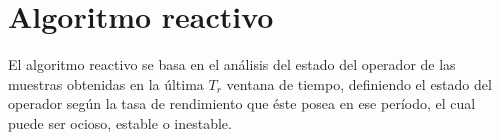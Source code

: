 


\section{Algoritmo reactivo}

\normalsize{El algoritmo reactivo se basa en el análisis del estado del operador de las muestras obtenidas en la última $T_r$ ventana de tiempo, definiendo el estado del operador según la tasa de rendimiento que éste posea en ese período, el cual puede ser ocioso, estable o inestable.}

